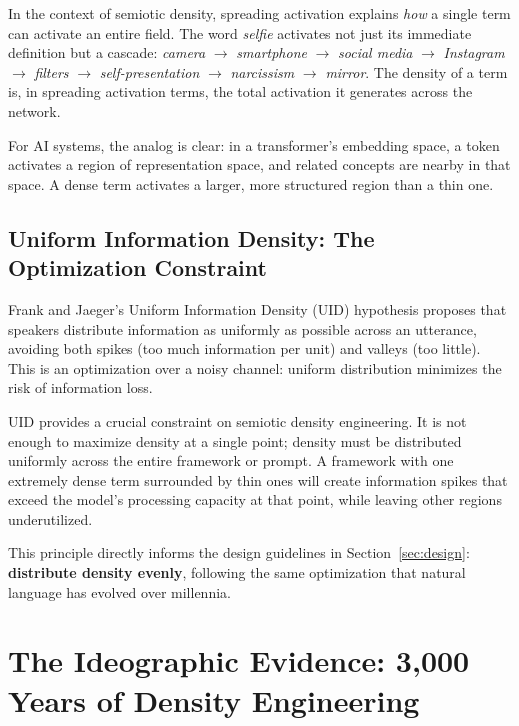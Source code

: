 \documentclass[12pt,a4paper]{article}
\begin{document}
In the context of semiotic density, spreading activation explains \textit{how} a single term can activate an entire field.
The word \textit{selfie} activates not just its immediate definition but a cascade: \textit{camera} $\rightarrow$ \textit{smartphone} $\rightarrow$ \textit{social media} $\rightarrow$ \textit{Instagram} $\rightarrow$ \textit{filters} $\rightarrow$ \textit{self-presentation} $\rightarrow$ \textit{narcissism} $\rightarrow$ \textit{mirror}.
The density of a term is, in spreading activation terms, the total activation it generates across the network.

For AI systems, the analog is clear: in a transformer's embedding space, a token activates a region of representation space, and related concepts are nearby in that space.
A dense term activates a larger, more structured region than a thin one.

\subsection{Uniform Information Density: The Optimization Constraint}
\label{subsec:uid}

Frank and Jaeger's Uniform Information Density (UID) hypothesis \cite{frank2008} proposes that speakers distribute information as uniformly as possible across an utterance, avoiding both spikes (too much information per unit) and valleys (too little).
This is an optimization over a noisy channel: uniform distribution minimizes the risk of information loss.

UID provides a crucial constraint on semiotic density engineering.
It is not enough to maximize density at a single point; density must be distributed uniformly across the entire framework or prompt.
A framework with one extremely dense term surrounded by thin ones will create information spikes that exceed the model's processing capacity at that point, while leaving other regions underutilized.

This principle directly informs the design guidelines in Section~\ref{sec:design}: \textbf{distribute density evenly}, following the same optimization that natural language has evolved over millennia.


\section{The Ideographic Evidence: 3,000 Years of Density Engineering}
\label{sec:ideographic}
\end{document}
